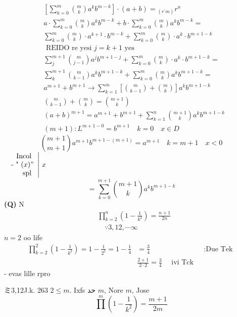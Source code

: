 \documentclass[12pt]{article}
\begin{document}
\[
\begin{aligned}
& {\left[\sum_{k=0}^{m}\binom{m}{k} a^{k} b^{m-k}\right] \cdot(a+b)={ }_{\left(r^{\prime} m\right)} r^{n}} \\
& a \cdot \sum_{k=0}^{m}\binom{m}{k} a^{k} b^{m-k}+b \cdot \sum_{k=0}^{m}\binom{m}{k} a^{k} b^{m-k}= \\
& \sum_{k=0}^{m}\binom{m}{k} \cdot a^{k+1} \cdot b^{m-k}+\sum_{k=0}^{m}\binom{m}{k} \cdot a^{k} \cdot b^{m+1-k} \\
& \text { REIDO re yesi } j=k+1 \text { yes } \\
& \sum_{j}^{m+1}\binom{m}{j-1} a^{j} b^{m+1-j}+\sum_{k=0}^{m}\binom{m}{k} \cdot a^{k} \cdot b^{m+1-k}= \\
& \sum_{k}^{m+1}\binom{m}{k-1} a^{k} b^{m+1-k}+\sum_{k=0}^{m}\binom{m}{k} a^{k} b^{m+1-k}= \\
& a^{m+1}+b^{m+1} \rightarrow \sum_{k=1}^{m}\left[\binom{m}{k-1}+\binom{m}{k}\right] a^{k} b^{m+1-k} \\
& \binom{m}{k-1}+\binom{m}{k}=\binom{m+1}{k} \\
& (a+b)^{m+1}=a^{m+1}+b^{m+1}+\sum_{k=1}^{n}\binom{m+1}{k} a^{k} b^{m+1-k} \\
& (m+1): L^{m+1-0}=b^{m+1} \quad k=0 \quad x \in D
\end{aligned}
\]
\[
\binom{m+1}{m+1} a^{m+1} b^{m+1-(m+1)}=a^{m+1} \quad k=m+1 \quad x<0
\]
\(\left.\begin{array}{r}\text { Incol } \\ \text { - " }(x) " \\ \text { spl }\end{array} \right\rvert\, x\)
\[
=\sum_{k=0}^{m+1}\binom{m+1}{k} a^{k} b^{m+1-k}
\]
\textbf{(Q)}
N
\[
\begin{aligned}
& \prod_{k=2}^{n}\left(1-\frac{1}{k^{2}}\right)=\frac{n+1}{2 n} \\
& \quad \because 3,12, \cdots \infty
\end{aligned}
\]
\(n=2\) oo life
\[
\begin{array}{rlr}
\prod_{k=2}^{2}\left(1-\frac{1}{k^{2}}\right)=1-\frac{1}{2^{2}}=1-\frac{1}{4} & =\frac{3}{4} & \text { :Due Tek } \\
& \frac{2+1}{2 \cdot 2}=\frac{3}{4} \quad \text { ivi Tck }
\end{array}
\]
- evas lille rpro

ミ3,12J.k. 263
\(2 \leq m\). Ixfs حد \(m\), Nore \(m\), Jose
\[
\prod^{m}\left(1-\frac{1}{k^{2}}\right)=\frac{m+1}{2 m}
\]
\end{document}
